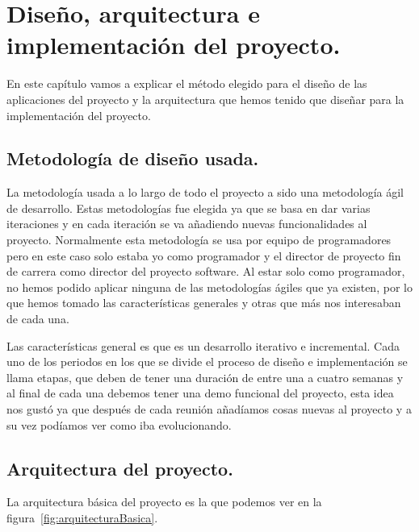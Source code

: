 \chapter[Diseño, arquitectura e implementación]{Diseño, arquitectura e implementación del proyecto.}

En este capítulo vamos a explicar el método elegido para el diseño de las aplicaciones del proyecto y la arquitectura que hemos tenido que diseñar para la implementación del proyecto.

\section{Metodología de diseño usada.}

La metodología usada a lo largo de todo el proyecto a sido una metodología ágil de desarrollo. Estas metodologías fue elegida ya que se basa en dar varias iteraciones y en cada iteración se va añadiendo nuevas funcionalidades al proyecto. Normalmente esta metodología se usa por equipo de programadores pero en este caso solo estaba yo como programador y el director de proyecto fin de carrera como director del proyecto software. Al estar solo como programador, no hemos podido aplicar ninguna de las metodologías ágiles que ya existen, por lo que hemos tomado las características generales y otras que más nos interesaban de cada una.

Las características general es que es un desarrollo iterativo e incremental. Cada uno de los periodos en los que se divide el proceso de diseño e implementación se llama etapas, que deben de tener una duración de entre una a cuatro semanas y al final de cada una debemos tener una demo funcional del proyecto, esta idea nos gustó ya que después de cada reunión añadíamos cosas nuevas al proyecto y a su vez podíamos ver como iba evolucionando.  

\section{Arquitectura del proyecto.}

La arquitectura básica del proyecto es la que podemos ver en la figura~\ref{fig:arquitecturaBasica}.

